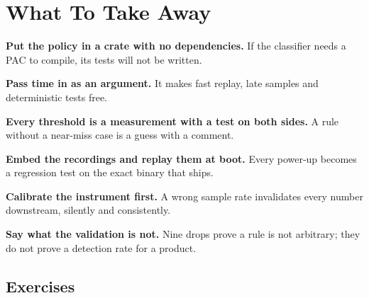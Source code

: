 \section{What To Take Away}
\label{sec:testing-takeaways}

\begin{keytakeaways}
    \item \textbf{Put the policy in a crate with no dependencies.} If the classifier needs a
          PAC to compile, its tests will not be written.
    \item \textbf{Pass time in as an argument.} It makes fast replay, late samples and
          deterministic tests free.
    \item \textbf{Every threshold is a measurement with a test on both sides.} A rule without
          a near-miss case is a guess with a comment.
    \item \textbf{Embed the recordings and replay them at boot.} Every power-up becomes a
          regression test on the exact binary that ships.
    \item \textbf{Calibrate the instrument first.} A wrong sample rate invalidates every
          number downstream, silently and consistently.
    \item \textbf{Say what the validation is not.} Nine drops prove a rule is not arbitrary;
          they do not prove a detection rate for a product.
\end{keytakeaways}

\subsection{Exercises}

